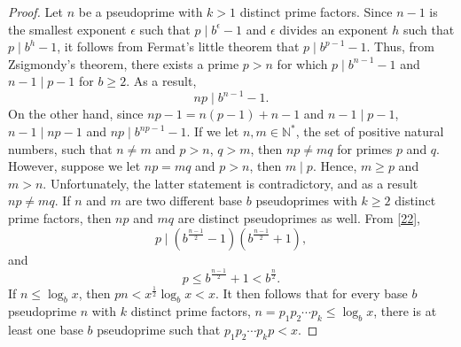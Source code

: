 \documentclass[11pt]{article}
\theoremstyle{plain}
\theoremstyle{definition}
\theoremstyle{remark}
\numberwithin{equation}{subsection}
\begin{document}
\begin{proof}
Let $n$ be a pseudoprime with $k > 1$ distinct prime factors. Since $n-1$ is the smallest exponent $\epsilon$ such that $p \mid b^{\epsilon}-1$ and $\epsilon$ divides an exponent $h$ such that $p \mid b^{h}-1$, it follows from Fermat's little theorem that $p \mid b^{p-1}-1$. Thus, from Zsigmondy's theorem, there exists a prime $p > n$ for which $p\mid{{b^{n-1}}-1}$ and $n-1\mid p-1$ for $b \ge 2$. As a result,
\begin{equation} \label{22}
np\mid{{b^{n-1}}-1}.
\end{equation}
On the other hand, since $np-1 = n(p-1)+n-1$ and $n-1 \mid p-1$, $n-1 \mid np-1$ and $np \mid {b^{np-1}}-1$. If we let $n,m \in \mathbb{N}^*$, the set of positive natural numbers, such that $n \ne m$ and $p > n$, $q > m$, then ${n}{p} \ne {m}{q}$ for primes $p$ and $q$. However, suppose we let ${n}{p} = {m}{q}$ and $p > n$, then $m \mid p$. Hence, $m \ge p$ and $m > n$. Unfortunately, the latter statement is contradictory, and as a result ${n}{p} \ne {m}{q}$. If $n$ and $m$ are two different base $b$ pseudoprimes with $k \ge 2$ distinct prime factors, then ${n}{p}$ and ${m}{q}$ are distinct pseudoprimes as well. \newline
\indent From \eqref{22},
\begin{equation} \label{23}
p\mid({b^{\frac{n-1}{2}}}-1)({b^{\frac{n-1}{2}}}+1),
\end{equation}
and
\begin{equation} \label{24}
p \le b^{\frac{n-1}{2}}+1 < b^{\frac{n}{2}}.
\end{equation}
If $n \le \log_{b} x$, then $pn < {x^{\frac{1}{2}}}{\log_{b} x} < x$. It then follows that for every base $b$ pseudoprime $n$ with $k$ distinct prime factors, $n={p_1}{p_2}\cdots{p_{k}} \le \log_{b} x$, there is at least one base $b$ pseudoprime such that ${p_1}{p_2}\cdots{p_{k}}{p} < x$.
\end{proof}
\end{document}
